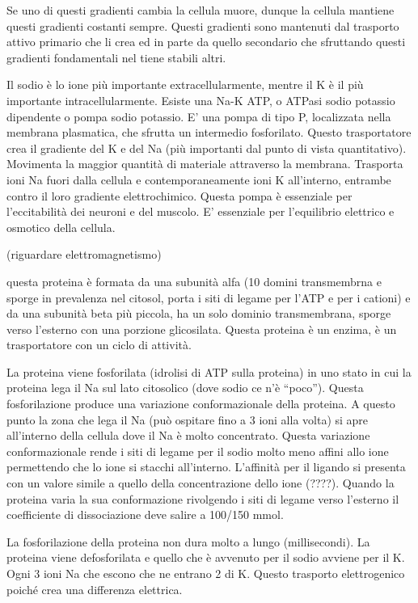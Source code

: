 \documentclass[]{article}
\begin{document}
Se uno di questi gradienti cambia la cellula muore, dunque la cellula
mantiene questi gradienti costanti sempre. Questi gradienti sono
mantenuti dal trasporto attivo primario che li crea ed in parte da
quello secondario che sfruttando questi gradienti fondamentali nel tiene
stabili altri.

Il sodio è lo ione più importante extracellularmente, mentre il K è il
più importante intracellularmente. Esiste una Na-K ATP, o ATPasi sodio
potassio dipendente o pompa sodio potassio. E' una pompa di tipo P,
localizzata nella membrana plasmatica, che sfrutta un intermedio
fosforilato. Questo trasportatore crea il gradiente del K e del Na (più
importanti dal punto di vista quantitativo). Movimenta la maggior
quantità di materiale attraverso la membrana. Trasporta ioni Na fuori
dalla cellula e contemporaneamente ioni K all'interno, entrambe contro
il loro gradiente elettrochimico. Questa pompa è essenziale per
l'eccitabilità dei neuroni e del muscolo. E' essenziale per l'equilibrio
elettrico e osmotico della cellula.

(riguardare elettromagnetismo)

questa proteina è formata da una subunità alfa (10 domini transmembrna e
sporge in prevalenza nel citosol, porta i siti di legame per l'ATP e per
i cationi) e da una subunità beta più piccola, ha un solo dominio
transmembrana, sporge verso l'esterno con una porzione glicosilata.
Questa proteina è un enzima, è un trasportatore con un ciclo di
attività.

La proteina viene fosforilata (idrolisi di ATP sulla proteina) in uno
stato in cui la proteina lega il Na sul lato citosolico (dove sodio ce
n'è ``poco''). Questa fosforilazione produce una variazione
conformazionale della proteina. A questo punto la zona che lega il Na
(può ospitare fino a 3 ioni alla volta) si apre all'interno della
cellula dove il Na è molto concentrato. Questa variazione
conformazionale rende i siti di legame per il sodio molto meno affini
allo ione permettendo che lo ione si stacchi all'interno. L'affinità per
il ligando si presenta con un valore simile a quello della
concentrazione dello ione (????). Quando la proteina varia la sua
conformazione rivolgendo i siti di legame verso l'esterno il
coefficiente di dissociazione deve salire a 100/150 mmol.

La fosforilazione della proteina non dura molto a lungo (millisecondi).
La proteina viene defosforilata e quello che è avvenuto per il sodio
avviene per il K. Ogni 3 ioni Na che escono che ne entrano 2 di K.
Questo trasporto elettrogenico poiché crea una differenza elettrica.
\end{document}
